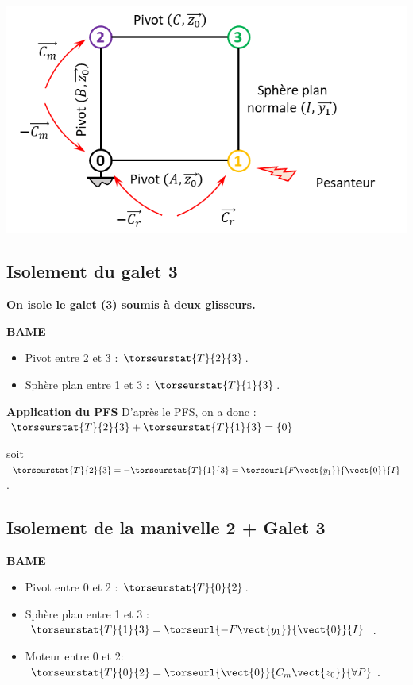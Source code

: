 \begin{center}
 \includegraphics[width=.95\textwidth]{images/fig_02}
\end{center}


\subsection{Isolement du galet 3}
\textbf{On isole le galet (3) soumis à deux glisseurs.}

\textbf{BAME}
\begin{itemize}
\item Pivot entre 2 et 3 : $\torseurstat{T}{2}{3}$.
\item Sphère plan entre 1 et 3 : $\torseurstat{T}{1}{3}$.
\end{itemize}

\textbf{Application du PFS}
D'après le PFS, on a donc :
$\torseurstat{T}{2}{3}+\torseurstat{T}{1}{3}= \{0\}$

soit $\torseurstat{T}{2}{3}=-\torseurstat{T}{1}{3}= \torseurl{F\vect{y_1}}{\vect{0}}{I}$.

\subsection{Isolement de la manivelle 2 + Galet 3}

\textbf{BAME}
\begin{itemize}
\item Pivot entre 0 et 2 : $\torseurstat{T}{0}{2}$.
\item Sphère plan entre 1 et 3 : $\torseurstat{T}{1}{3}= \torseurl{-F\vect{y_1}}{\vect{0}}{I}$ .
\item Moteur entre 0 et 2: $\torseurstat{T}{0}{2}= \torseurl{\vect{0}}{C_m\vect{z_0}}{\forall P}$.
\end{itemize}

